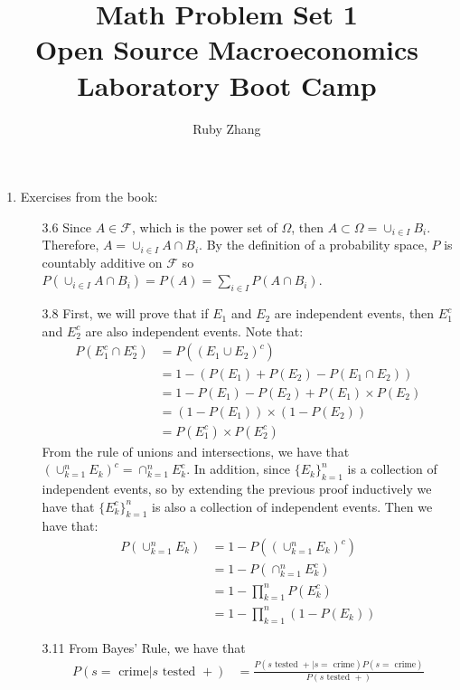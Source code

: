 \documentclass[letterpaper,12pt]{article}
\theoremstyle{definition}
\begin{document}
\title{Math Problem Set 1 \\
Open Source Macroeconomics Laboratory Boot Camp}
\author{Ruby Zhang}
\maketitle

\begin{enumerate}
  \item Exercises from the book:
    \begin{enumerate}
    \item[3.6]
    Since $A \in \mathscr{F}$, which is the power set of $\Omega$, then $A \subset \Omega = \cup_{i \in I} B_i$. Therefore, $A = \cup_{i \in I} A \cap B_i$. By the definition of a probability space, $P$ is countably additive on $\mathscr{F}$ so $P(\cup_{i \in I} A \cap B_i) = P(A) = \sum_{i \in I} P(A \cap B_i)$.
    \item[3.8]
    First, we will prove that if $E_1$ and $E_2$ are independent events, then $E_1^c$ and $E_2^c$ are also independent events. Note that:
      \begin{align*}
        P(E_1^c \cap E_2^c) &= P((E_1 \cup E_2)^c) \\
        & = 1 - (P(E_1) + P(E_2) - P(E_1 \cap E_2)) \\
        &= 1 - P(E_1) - P(E_2) + P(E_1) \times P(E_2) \\
        & = (1 - P(E_1))\times(1-P(E_2)) \\
        & = P(E_1^c) \times P(E_2^c)
      \end{align*}
    From the rule of unions and intersections, we have that $(\cup_{k=1}^n E_k)^c = \cap_{k=1}^n E_k^c$. In addition, since $\{E_k\}_{k=1}^n$ is a collection of independent events, so by extending the previous proof inductively we have that $\{E_k^c\}_{k=1}^n$ is also a collection of independent events. Then we have that:
      \begin{align*}
        P(\cup_{k=1}^n E_k) &= 1 - P((\cup_{k=1}^n E_k)^c) \\
        &= 1 - P(\cap_{k=1}^n E_k^c) \\
        &= 1 - \prod_{k=1}^n P(E_k^c) \\
        &= 1 - \prod_{k=1}^n (1 - P(E_k))
      \end{align*}
    \item[3.11]
      From Bayes' Rule, we have that
      \begin{align*}
        P(s=\text{ crime}|s\text{ tested }+) &= \frac{P(s\text{ tested }+|s=\text{ crime})P(s=\text{ crime})}{P(s\text{ tested }+)} \\

\end{align*}
\end{enumerate}
\end{enumerate}
\end{document}

